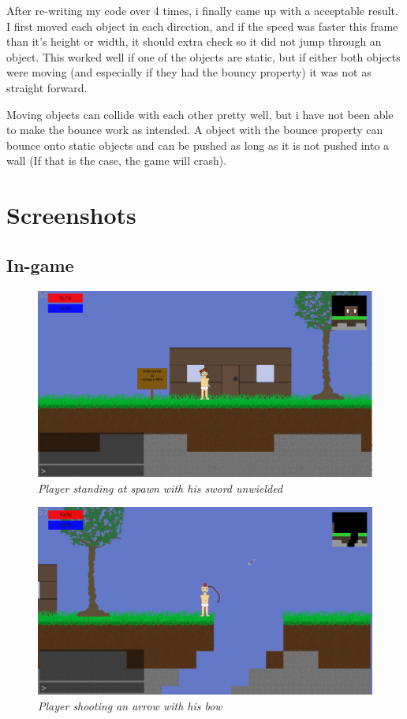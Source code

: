 \documentclass[a4paper,12pt]{article}
\begin{document}
After re-writing my code over 4 times, i finally came up with a acceptable result.
I first moved each object in each direction, and if the speed was faster this frame than it's height or width, it should extra check so it did not jump through an object.
This worked well if one of the objects are static, but if either both objects were moving (and especially if they had the bouncy property) it was not as straight forward.

Moving objects can collide with each other pretty well, but i have not been able to make the bounce work as intended.
A object with the bounce property can bounce onto static objects and can be pushed as long as it is not pushed into a wall (If that is the case, the game will crash).


\section{Screenshots}

\subsection{In-game}

\begin{figure}[H]
\includegraphics[width=\textwidth]{img/screenshot1.eps}\\
\emph{%
    Player standing at spawn with his sword unwielded
}
\end{figure}

\noindent
\vspace{10pt}
\begin{figure}[H]
\includegraphics[width=\textwidth]{img/screenshot2.eps}\\
\emph{%
    Player shooting an arrow with his bow
}
\end{figure}
\end{document}
